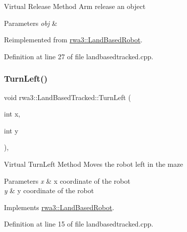Virtual Release Method Arm release an object 
\begin{DoxyParams}{Parameters}
{\em obj} & \\
\hline
\end{DoxyParams}


Reimplemented from \hyperlink{classrwa3_1_1_land_based_robot_a5cae9fc0c1365b984e09b807f79089e0}{rwa3\+::\+Land\+Based\+Robot}.



Definition at line 27 of file landbasedtracked.\+cpp.

\mbox{\label{classrwa3_1_1_land_based_tracked_a6f8d74079ad047edd9f17cc541eafa86}} 
\subsubsection{\texorpdfstring{Turn\+Left()}{TurnLeft()}}
{\footnotesize\ttfamily void rwa3\+::\+Land\+Based\+Tracked\+::\+Turn\+Left (\begin{DoxyParamCaption}\item[{int}]{x,  }\item[{int}]{y }\end{DoxyParamCaption})\hspace{0.3cm}{\ttfamily [override]}, {\ttfamily [virtual]}}

Virtual Turn\+Left Method Moves the robot left in the maze 
\begin{DoxyParams}{Parameters}
{\em x} & x coordinate of the robot \\
\hline
{\em y} & y coordinate of the robot \\
\hline
\end{DoxyParams}


Implements \hyperlink{classrwa3_1_1_land_based_robot_a9adfb103725320c1daff9ab72b0aad08}{rwa3\+::\+Land\+Based\+Robot}.



Definition at line 15 of file landbasedtracked.\+cpp.

\mbox{\label{classrwa3_1_1_land_based_tracked_a5f6a5b1871d9f75d8a724b8d7ae44d1f}} 
